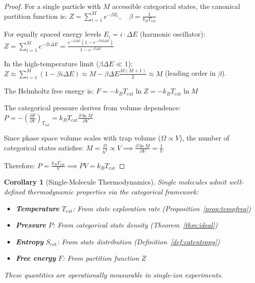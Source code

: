 \documentclass[twocolumn,10pt]{article}
\newtheorem{corollary}[theorem]{Corollary}
\begin{document}
\begin{proof}
For a single particle with $M$ accessible categorical states, the canonical partition function is:
$
Z = \sum_{i=1}^{M} e^{-\beta E_i}, \quad \beta = \frac{1}{k_B T_{\mathrm{cat}}}
$

For equally spaced energy levels $E_i = i \cdot \Delta E$ (harmonic oscillator):
$
Z = \sum_{i=1}^{M} e^{-\beta i \Delta E} = \frac{e^{-\beta \Delta E}(1 - e^{-\beta M \Delta E})}{1 - e^{-\beta \Delta E}}
$

In the high-temperature limit ($\beta \Delta E \ll 1$):
$
Z \approx \sum_{i=1}^{M} (1 - \beta i \Delta E) \approx M - \beta \Delta E \frac{M(M+1)}{2} \approx M
$
(leading order in $\beta$).

The Helmholtz free energy is:
$
F = -k_B T_{\mathrm{cat}} \ln Z = -k_B T_{\mathrm{cat}} \ln M
$

The categorical pressure derives from volume dependence:
$
P = -\left(\frac{\partial F}{\partial V}\right)_{T_{\mathrm{cat}}} = k_B T_{\mathrm{cat}} \frac{\partial \ln M}{\partial V}
$

Since phase space volume scales with trap volume ($\Omega \propto V$), the number of categorical states satisfies:
$
M = \frac{\Omega}{h^d} \propto V \implies \frac{\partial \ln M}{\partial V} = \frac{1}{V}
$

Therefore:
$
P = \frac{k_B T_{\mathrm{cat}}}{V} \implies PV = k_B T_{\mathrm{cat}}
$
\end{proof}

\begin{corollary}[Single-Molecule Thermodynamics]
\label{cor:singlemol}
Single molecules admit well-defined thermodynamic properties via the categorical framework:
\begin{itemize}
    \item \textbf{Temperature} $T_{\mathrm{cat}}$: From state exploration rate (Proposition~\ref{prop:tempfreq})
    \item \textbf{Pressure} $P$: From categorical state density (Theorem~\ref{thm:ideal})
    \item \textbf{Entropy} $S_{\mathrm{cat}}$: From state distribution (Definition~\ref{def:catentropy})
    \item \textbf{Free energy} $F$: From partition function $Z$
\end{itemize}
These quantities are \emph{operationally measurable} in single-ion experiments.
\end{corollary}
\end{document}
